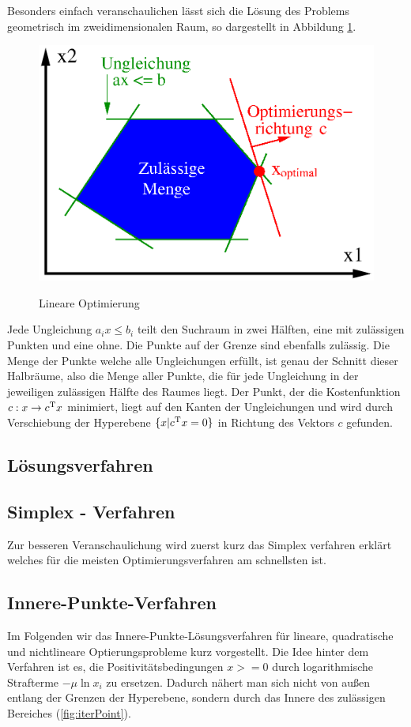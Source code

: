 \documentclass{like}
\begin{document}
Besonders einfach veranschaulichen lässt sich die Lösung des Problems geometrisch im zweidimensionalen Raum, so dargestellt in Abbildung \ref*{fig:linOpt}.

\begin{figure}[ht!]
	\caption{Lineare Optimierung}
	\includegraphics[width=350pt]{Abbildungen/linOpt.png}
	\label{fig:linOpt}
\end{figure}

Jede Ungleichung $a_i x \leq b_i$ teilt den Suchraum in zwei Hälften, eine mit zulässigen Punkten und eine ohne. Die Punkte auf der Grenze sind ebenfalls zulässig. Die Menge der Punkte welche alle Ungleichungen erfüllt, ist genau der Schnitt dieser Halbräume, also die Menge aller Punkte, die für jede Ungleichung in der jeweiligen zulässigen Hälfte des Raumes liegt. 
Der Punkt, der die Kostenfunktion $c: x \rightarrow c\textsuperscript{T} x$ minimiert, liegt auf den Kanten der Ungleichungen und wird durch Verschiebung der Hyperebene $ \{x| c\textsuperscript{T} x = 0 \}$ in Richtung des Vektors \(c\) gefunden. 


 \subsection*{Lösungsverfahren}

\subsection{Simplex - Verfahren}
Zur besseren Veranschaulichung wird zuerst kurz das Simplex verfahren erklärt welches für die meisten Optimierungsverfahren am schnellsten ist.

  
 \subsection{Innere-Punkte-Verfahren}  
 Im Folgenden wir das Innere-Punkte-Lösungsverfahren für lineare, quadratische und nichtlineare Optierungsprobleme kurz vorgestellt. Die Idee hinter dem Verfahren ist es, die Positivitätsbedingungen $x >= 0$ durch logarithmische Strafterme $-\mu \ln x_i $ zu ersetzen. Dadurch nähert man sich nicht von außen entlang der Grenzen der Hyperebene, sondern durch das Innere des zulässigen Bereiches (\ref{fig:iterPoint}). 
  
\end{document}
